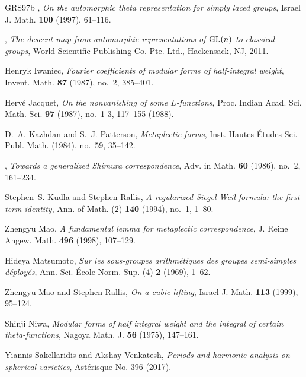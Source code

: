 \begin{thebibliography}{GRS97b}
\bysame, \emph{On the automorphic theta representation for simply laced
  groups}, Israel J. Math. \textbf{100} (1997), 61--116. 

\bysame, \emph{The descent map from automorphic representations of {${\rm
  GL}(n)$} to classical groups}, World Scientific Publishing Co. Pte. Ltd.,
  Hackensack, NJ, 2011. 

Henryk Iwaniec, \emph{Fourier coefficients of modular forms of half-integral
  weight}, Invent. Math. \textbf{87} (1987), no.~2, 385--401. 

Herv{\'e} Jacquet, \emph{On the nonvanishing of some {$L$}-functions}, Proc.
  Indian Acad. Sci. Math. Sci. \textbf{97} (1987), no.~1-3, 117--155 (1988).

D.~A. Kazhdan and S.~J. Patterson, \emph{Metaplectic forms}, Inst. Hautes
  \'Etudes Sci. Publ. Math. (1984), no.~59, 35--142. 

\bysame, \emph{Towards a generalized {S}himura correspondence}, Adv. in Math.
  \textbf{60} (1986), no.~2, 161--234. 

Stephen~S. Kudla and Stephen Rallis, \emph{A regularized {S}iegel-{W}eil
  formula: the first term identity}, Ann. of Math. (2) \textbf{140} (1994),
  no.~1, 1--80. 

Zhengyu Mao, \emph{A fundamental lemma for metaplectic correspondence}, J.
  Reine Angew. Math. \textbf{496} (1998), 107--129. 

Hideya Matsumoto, \emph{Sur les sous-groupes arithm\'{e}tiques des groupes
  semi-simples d\'{e}ploy\'{e}s}, Ann. Sci. \'{E}cole Norm. Sup. (4) \textbf{2}
  (1969), 1--62. 

Zhengyu Mao and Stephen Rallis, \emph{On a cubic lifting}, Israel J. Math.
  \textbf{113} (1999), 95--124. 

Shinji Niwa, \emph{Modular forms of half integral weight and the integral of
  certain theta-functions}, Nagoya Math. J. \textbf{56} (1975), 147--161.
  
  Yiannis Sakellaridis and Akshay Venkatesh, 
  \emph{Periods and harmonic analysis on spherical varieties}, 
  Ast\'erisque No. 396 (2017). 


\end{thebibliography}
